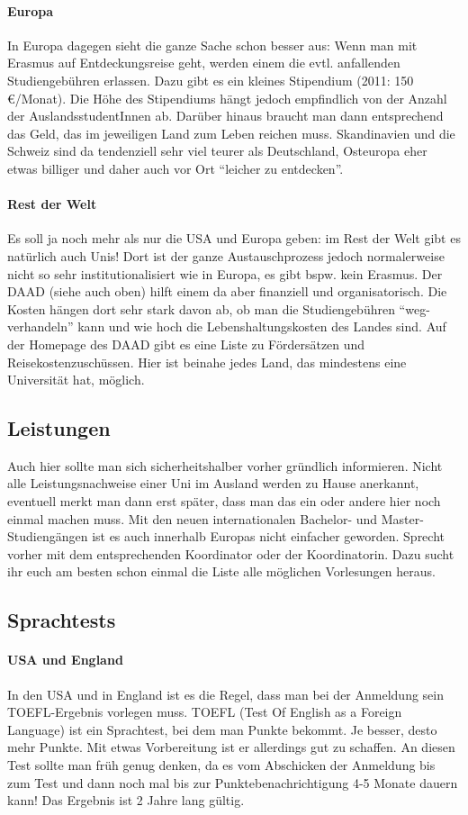 \paragraph{Europa} In Europa dagegen sieht die ganze Sache schon besser aus: Wenn man mit Erasmus auf Entdeckungsreise geht, werden einem die evtl. anfallenden Studiengebühren erlassen. Dazu gibt es ein kleines Stipendium (2011: 150 \euro{}/Monat). Die Höhe des Stipendiums hängt jedoch empfindlich von der Anzahl der AuslandsstudentInnen ab. Darüber hinaus braucht man dann entsprechend das Geld, das im jeweiligen Land zum Leben reichen muss. Skandinavien und die Schweiz sind da tendenziell sehr viel teurer als Deutschland, Osteuropa eher etwas billiger und daher auch vor Ort "`leicher zu entdecken"'.

\paragraph{Rest der Welt} Es soll ja noch mehr als nur die USA und Europa geben: im Rest der Welt gibt es natürlich auch Unis! Dort ist der ganze Austauschprozess jedoch normalerweise nicht so sehr institutionalisiert wie in Europa, es gibt bspw. kein Erasmus. Der DAAD (siehe auch oben) hilft einem da aber finanziell und organisatorisch. Die Kosten hängen dort sehr stark davon ab, ob man die Studiengebühren "`weg-verhandeln"' kann und wie hoch die Lebenshaltungskosten des Landes sind. Auf der Homepage des DAAD gibt es eine Liste zu Fördersätzen und Reisekostenzuschüssen. Hier ist beinahe jedes Land, das mindestens eine Universität hat, möglich.

\subsection{Leistungen}
Auch hier sollte man sich sicherheitshalber vorher gründlich informieren.
Nicht alle Leistungsnachweise einer Uni im Ausland werden zu Hause anerkannt,
eventuell merkt man dann erst später, dass man das ein oder andere hier noch einmal machen muss.
Mit den neuen internationalen Bachelor- und Master-Studiengängen ist es auch innerhalb Europas nicht einfacher geworden.
Sprecht vorher mit dem entsprechenden Koordinator oder der Koordinatorin.
Dazu sucht ihr euch am besten schon einmal die Liste alle möglichen Vorlesungen heraus.
%
\subsection{Sprachtests}
\paragraph{USA und England}
In den USA und in England ist es die Regel, dass man bei der Anmeldung sein TOEFL-Ergebnis vorlegen muss.
TOEFL (Test Of English as a Foreign Language) ist ein Sprachtest, bei dem man Punkte bekommt.
Je besser, desto mehr Punkte.
Mit etwas Vorbereitung ist er allerdings gut zu schaffen.
An diesen Test sollte man früh genug denken, da es vom Abschicken der Anmeldung bis zum Test
und dann noch mal bis zur Punktebenachrichtigung 4-5 Monate dauern kann!
Das Ergebnis ist 2 Jahre lang gültig.

